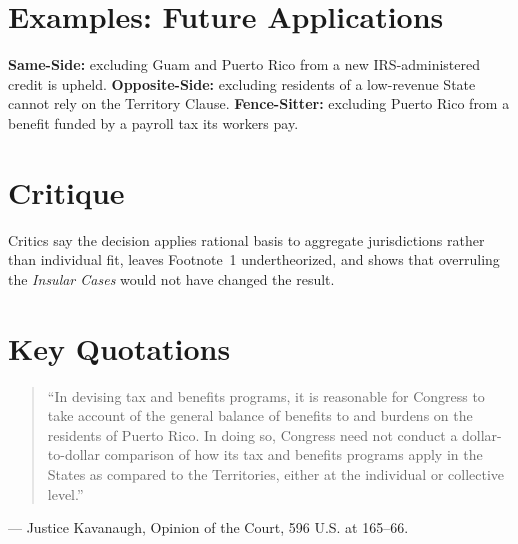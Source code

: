 \documentclass[12pt]{article}
\begin{document}
\section{Examples: Future Applications}
\textbf{Same-Side:} excluding Guam and Puerto Rico from a new IRS-administered credit is upheld. \textbf{Opposite-Side:} excluding residents of a low-revenue State cannot rely on the Territory Clause. \textbf{Fence-Sitter:} excluding Puerto Rico from a benefit funded by a payroll tax its workers pay.

\section{Critique}
Critics say the decision applies rational basis to aggregate jurisdictions rather than individual fit, leaves Footnote~1 undertheorized, and shows that overruling the \textit{Insular Cases} would not have changed the result.

\section{Key Quotations}
\begin{quote}
``In devising tax and benefits programs, it is reasonable for Congress to take account of the general balance of benefits to and burdens on the residents of Puerto Rico. In doing so, Congress need not conduct a dollar-to-dollar comparison of how its tax and benefits programs apply in the States as compared to the Territories, either at the individual or collective level.''
\end{quote}
\noindent --- Justice Kavanaugh, Opinion of the Court, 596 U.S. at 165--66.
\end{document}
